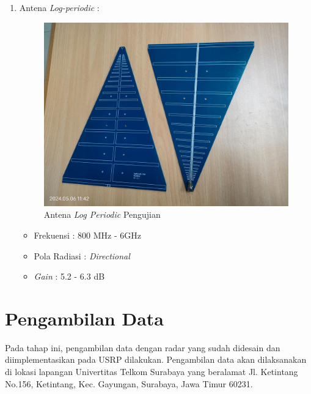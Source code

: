 \begin{enumerate}
	\item Antena \textit{Log-periodic} :
	\begin{figure}
		\begin{center}
			\includegraphics[scale=0.05]{pics/bab3/logPeriodic.jpg}
			\caption{Antena \textit{Log Periodic} Pengujian}
			\label{img:usrpBoard}
		\end{center}
	\end{figure}
	\begin{itemize}
		\item Frekuensi : 800 MHz - 6GHz 
		\item Pola Radiasi : \textit{Directional}
		\item \textit{Gain} : 5.2 - 6.3 dB
	\end{itemize}
\end{enumerate}

	
\section{Pengambilan Data}
Pada tahap ini, pengambilan data dengan radar yang sudah didesain dan diimplementasikan pada USRP dilakukan. Pengambilan data akan dilaksanakan di lokasi lapangan Univertitas Telkom Surabaya yang beralamat Jl. Ketintang No.156, Ketintang, Kec. Gayungan, Surabaya, Jawa Timur 60231.

